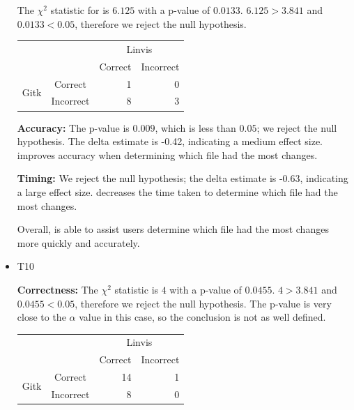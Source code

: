 \begin{itemize}
    The $\chi^2$ statistic for \comB is $6.125$ with a p-value of
    $0.0133$. $6.125 > 3.841$ and $0.0133 < 0.05$, therefore we reject
    the null hypothesis.
    \vspace{2mm}
    \begin{tabular}{cc|rr}
                             &           & \multicolumn{2}{c}{Linvis}\\
                             &           & Correct                      & Incorrect\\\hline
      \multirow{2}{*}{Gitk}  & Correct   & 1                            & 0\\
                             & Incorrect & 8                            & 3\\
    \end{tabular}
    \vspace{3mm}

    \textbf{Accuracy:} The p-value is $0.009$, which is less than
    $0.05$; we reject the null hypothesis. The delta estimate is -0.42,
    indicating a medium effect size. \tool improves accuracy when
    determining which file had the most changes.

    \textbf{Timing:} We reject the null hypothesis; the delta estimate
    is -0.63, indicating a large effect size. \tool decreases the time
    taken to determine which file had the most changes.

    Overall, \tool is able to assist users determine which file had the
    most changes more quickly and accurately.

  \item T10

    \textbf{Correctness:}
    The $\chi^2$ statistic is $4$ with a p-value of $0.0455$.
    $4 > 3.841$ and $0.0455 < 0.05$, therefore we reject the null
    hypothesis. The p-value is very close to the $\alpha$ value in this
    case, so the conclusion is not as well defined.
    \vspace{2mm}
    \begin{tabular}{cc|rr}
      &           & \multicolumn{2}{c}{Linvis}\\
      &           & Correct                      & Incorrect\\\hline
      \multirow{2}{*}{Gitk}   & Correct   & 14                           & 1\\
      & Incorrect & 8                            & 0\\
    \end{tabular}
    \vspace{3mm}


\end{itemize}

